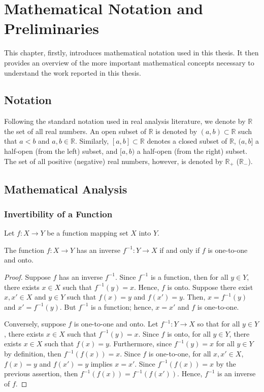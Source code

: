 \chapter{Mathematical Notation and Preliminaries} %
\label{cha:notation}

This chapter, firstly, introduces mathematical notation used in this thesis. It then provides an overview of the more important mathematical concepts necessary to understand the work reported in this thesis.

\section{Notation} %
\label{sec:notation_notation}
Following the standard notation used in real analysis literature, we denote by $\mathbb{R}$ the set of all real numbers. An open subset of $\mathbb{R}$ is denoted by $(a,b)\subset \mathbb{R}$ such that $a < b$ and $a,b\in\mathbb{R}$. Similarly, $[a,b]\subset\mathbb{R}$ denotes a closed subset of $\mathbb{R}$, $(a,b]$ a half-open (from the left) subset, and $[a,b)$ a half-open (from the right) subset. The set of all positive (negative) real numbers, however, is denoted by $\mathbb{R}_+$ ($\mathbb{R}_-$).

\section{Mathematical Analysis} %
\label{sec:mathematical_analysis_notation}

\subsection{Invertibility of a Function} %
\label{sub:invertibility_of_a_function_notation}
Let $f: X\to Y$ be a function mapping set $X$ into $Y$.
\begin{thm}
\label{thm:inverse_of_a_function_notation}
The function $f:X\to Y$ has an inverse $f^{-1}: Y\to X$ if and only if $f$ is one-to-one and onto.
\end{thm}
\begin{proof}
Suppose $f$ has an inverse $f^{-1}$. Since $f^{-1}$ is a function, then for all $y\in Y$, there exists $x\in X$ such that $f^{-1}(y) = x$. Hence, $f$ is onto. Suppose there exist $x,x'\in X$ and $y\in Y$ such that $f(x) = y$ and $f(x') = y$. Then, $x = f^{-1}(y)$ and $x' = f^{-1}(y)$. But $f^{-1}$ is a function; hence, $x = x'$ and $f$ is one-to-one.

Conversely, suppose $f$ is one-to-one and onto. Let $f^{-1}: Y\to X$ so that for all $y\in Y$, there exists $x\in X$ such that $f^{-1}(y) = x$. Since $f$ is onto, for all $y\in Y$, there exists $x\in X$ such that $f(x) = y$. Furthermore, since $f^{-1}(y) = x$ for all $y\in Y$ by definition, then $f^{-1}(f(x)) = x$. Since $f$ is one-to-one, for all $x,x'\in X$, $f(x) = y$ and $f(x') = y$ implies $x = x'$. Since $f^{-1}(f(x)) = x$ by the previous assertion, then $f^{-1}(f(x)) = f^{-1}(f(x'))$. Hence, $f^{-1}$ is an inverse of $f$.
\end{proof}


